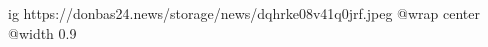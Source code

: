  
 
 
 
 

\ifcmt
  ig https://donbas24.news/storage/news/dqhrke08v41q0jrf.jpeg
  @wrap center
  @width 0.9
\fi
